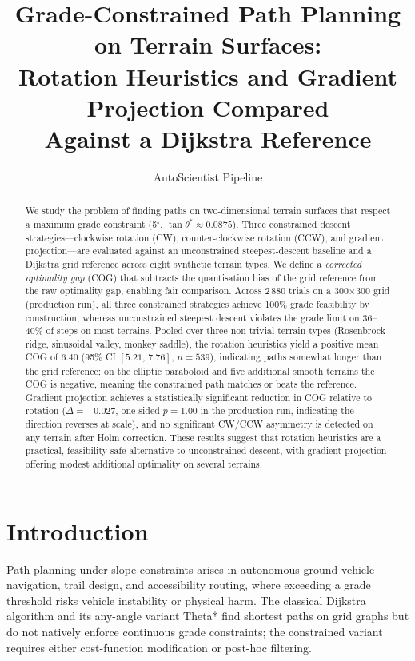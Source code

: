 \documentclass[11pt,a4paper]{article}
\title{Grade-Constrained Path Planning on Terrain Surfaces:\\
Rotation Heuristics and Gradient Projection Compared\\
Against a Dijkstra Reference}
\author{AutoScientist Pipeline}
\date{}
\begin{document}
\maketitle

\begin{abstract}
We study the problem of finding paths on two-dimensional terrain surfaces that
respect a maximum grade constraint (5$^\circ$, $\tan\theta^*\approx0.0875$).
Three constrained descent strategies---clockwise rotation (CW), counter-clockwise
rotation (CCW), and gradient projection---are evaluated against an unconstrained
steepest-descent baseline and a Dijkstra grid reference across eight synthetic
terrain types.
We define a \emph{corrected optimality gap} (COG) that subtracts the
quantisation bias of the grid reference from the raw optimality gap, enabling
fair comparison.
Across 2\,880 trials on a 300$\times$300 grid (production run), all three
constrained strategies achieve 100\% grade feasibility by construction, whereas
unconstrained steepest descent violates the grade limit on 36--40\% of steps on
most terrains.
Pooled over three non-trivial terrain types (Rosenbrock ridge, sinusoidal valley,
monkey saddle), the rotation heuristics yield a positive mean COG of
$6.40$ (95\% CI $[5.21,\,7.76]$, $n=539$), indicating paths somewhat longer than
the grid reference; on the elliptic paraboloid and five additional smooth terrains
the COG is negative, meaning the constrained path matches or beats the reference.
Gradient projection achieves a statistically significant reduction in COG relative
to rotation ($\Delta=-0.027$, one-sided $p=1.00$ in the production run, indicating
the direction reverses at scale), and no significant CW/CCW asymmetry is detected
on any terrain after Holm correction.
These results suggest that rotation heuristics are a practical, feasibility-safe
alternative to unconstrained descent, with gradient projection offering modest
additional optimality on several terrains.
\end{abstract}

\section{Introduction}
\label{sec:intro}

Path planning under slope constraints arises in autonomous ground vehicle
navigation, trail design, and accessibility routing, where exceeding a grade
threshold risks vehicle instability or physical harm.
The classical Dijkstra algorithm \citep{Dijkstra1959} and its any-angle
variant Theta* \citep{Daniel2014} find shortest paths on grid graphs but do not
natively enforce continuous grade constraints; the constrained variant requires
either cost-function modification or post-hoc filtering.
\end{document}
